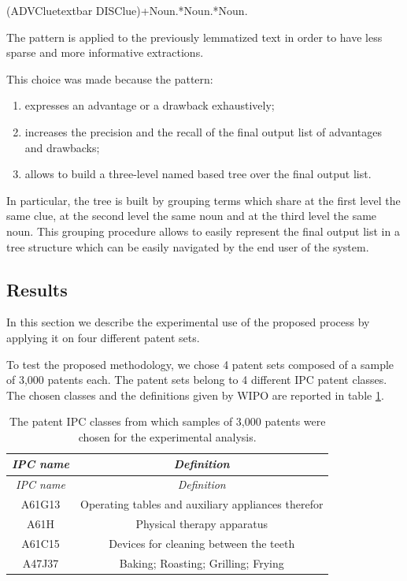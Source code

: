 \documentclass[]{book}
\providecommand{\tightlist}{%
  \setlength{\itemsep}{0pt}\setlength{\parskip}{0pt}}
\theoremstyle{definition}
\theoremstyle{definition}
\theoremstyle{definition}
\theoremstyle{remark}
\begin{document}
(ADVClue\textbar{}textbar DISClue)+Noun.*Noun.*Noun.

The pattern is applied to the previously lemmatized text in order to
have less sparse and more informative extractions.

This choice was made because the pattern:

\begin{enumerate}
\def\labelenumi{\arabic{enumi}.}
\tightlist
\item
  expresses an advantage or a drawback exhaustively;
\item
  increases the precision and the recall of the final output list of
  advantages and drawbacks;
\item
  allows to build a three-level named based tree over the final output
  list.
\end{enumerate}

In particular, the tree is built by grouping terms which share at the
first level the same clue, at the second level the same noun and at the
third level the same noun. This grouping procedure allows to easily
represent the final output list in a tree structure which can be easily
navigated by the end user of the system.

\subsection{Results}\label{results-1}

In this section we describe the experimental use of the proposed process
by applying it on four different patent sets.

To test the proposed methodology, we chose 4 patent sets composed of a
sample of 3,000 patents each. The patent sets belong to 4 different IPC
patent classes. The chosen classes and the definitions given by WIPO are
reported in table \ref{tab:advdrwarticleexampleipcclasses}.

\begin{longtable}[]{@{}cc@{}}
\caption{\label{tab:advdrwarticleexampleipcclasses} The patent IPC classes
from which samples of 3,000 patents were chosen for the experimental
analysis.}\tabularnewline
\toprule
\emph{IPC name} & \emph{Definition}\tabularnewline
\midrule
\endfirsthead
\toprule
\emph{IPC name} & \emph{Definition}\tabularnewline
\midrule
\endhead
A61G13 & Operating tables and auxiliary appliances
therefor\tabularnewline
A61H & Physical therapy apparatus\tabularnewline
A61C15 & Devices for cleaning between the teeth\tabularnewline
A47J37 & Baking; Roasting; Grilling; Frying\tabularnewline
\bottomrule
\end{longtable}
\end{document}
